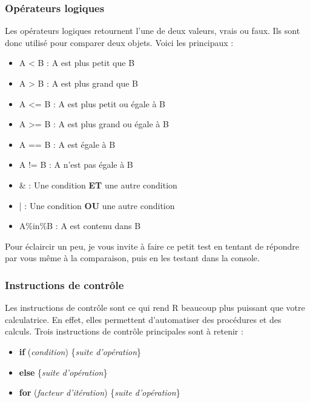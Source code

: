 \documentclass[10.5pt,a4paper]{article}
\begin{document}
    
    \subsubsection{Opérateurs logiques}
    Les opérateurs logiques retournent l'une de deux valeurs, vrais ou faux. Ils sont donc utilisé pour comparer deux objets. Voici les principaux : 
    \begin{itemize}
      \item A < B    : A est plus petit que B
      \item A > B    : A est plus grand que B
      \item A <= B   : A est plus petit ou égale à B
      \item A >= B   : A est plus grand ou égale à B
      \item A == B   : A est égale à B
      \item A != B   : A n'est pas égale à B
      \item \&       : Une condition \textbf{ET} une autre condition
      \item |        : Une condition \textbf{OU} une autre condition
      \item A\%in\%B : A est contenu dans B
    \end{itemize}
    
    Pour éclaircir un peu, je vous invite à faire ce petit test en tentant de répondre par vous même à la comparaison, puis en les testant dans la console.
    

    
    \subsubsection{Instructions de contrôle}
    Les instructions de contrôle sont ce qui rend R beaucoup plus puissant que votre calculatrice. En effet, elles permettent d'automatiser des procédures et des calculs. Trois instructions de contrôle principales sont à retenir :
    
    \begin{itemize}
      \item \textbf{if} (\emph{condition}) \{\emph{suite d'opération}\}
      \item \textbf{else} \{\emph{suite d'opération}\}
      \item \textbf{for} (\emph{facteur d'itération}) \{\emph{suite d'opération}\}
    \end{itemize}
    
\end{document}

